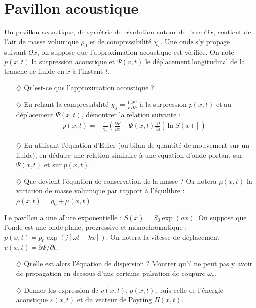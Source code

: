 \documentclass{report}
\begin{document}
\newpage

\section*{Pavillon acoustique}

Un pavillon acoustique, de symétrie de révolution autour de l'axe $Ox$, contient de l'air de masse volumique $\rho_0$ et de compressibilité $\chi_s$. Une onde s'y propage suivant $Ox$, on suppose que l'approximation acoustique est vérifiée. On note $p(x,t)$ la surpression acoustique et $\Psi(x,t)$ le déplacement longitudinal de la tranche de fluide en $x$ à l'instant $t$. 

\begin{itemize}

\item[$\diamondsuit$] Qu'est-ce que l'approximation acoustique ?

\item[$\diamondsuit$] En reliant la compressibilité $\chi_s=\frac{1}{V}\frac{\partial V}{\partial P}$ à la surpression $p(x,t)$ et au déplacement $\Psi(x,t)$, démontrer la relation suivante :
\begin{align*}
	p(x,t) = -\frac{1}{\chi_s}\left(\frac{\partial \Psi}{\partial x}+\Psi(x,t)\frac{\partial }{\partial x}\left[\ln S(x) \right]  \right)
\end{align*}

\item[$\diamondsuit$] En utilisant l'équation d'Euler (ou bilan de quantité de mouvement sur un fluide), en déduire une relation similaire à une équation d'onde portant sur $\Psi(x,t)$ et sur $p(x,t)$.

\item[$\diamondsuit$] Que devient l'équation de conservation de la masse ? On notera $\mu(x,t)$ la variation de masse volumique par rapport à l'équilibre : $\rho(x,t)=\rho_0+\mu(x,t)$
\end{itemize}

Le pavillon a une allure exponentielle : $S(x)=S_0\exp(ax)$. On suppose que l'onde est une onde plane, progressive et monochromatique : $p(x,t)=p_0\exp\left(j[\omega t-kx] \right)$. On notera la vitesse de déplacement $v(x,t)=\partial\Psi/\partial t$.

\begin{itemize}

\item[$\diamondsuit$]  Quelle est alors l'équation de dispersion ? Montrer qu'il ne peut pas y avoir de propagation en dessous d'une certaine pulsation de coupure $\omega_c$.

\item[$\diamondsuit$] Donner les expression de $v(x,t)$, $p(x,t)$, puis celle de l'énergie acoustique $\varepsilon(x,t)$ et du vecteur de Poyting $\Pi(x,t)$.

\end{itemize}
\end{document}
